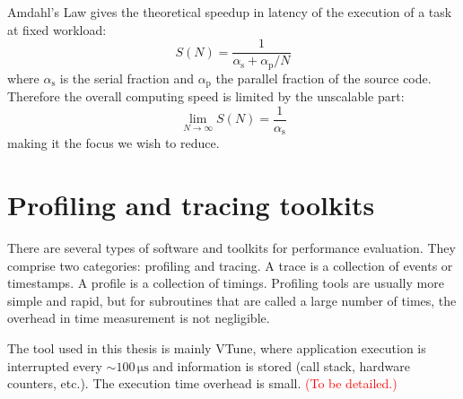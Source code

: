 Amdahl's Law gives the theoretical speedup in latency of the execution
of a task at fixed workload:
\begin{equation}
S(N)=\dfrac{1}{\alpha_{\mathrm{s}}+\alpha_{\mathrm{p}}/N}
\end{equation}
where $\alpha_{\mathrm{s}}$ is the serial fraction and $\alpha_{\mathrm{p}}$
the parallel fraction of the source code. Therefore the overall computing
speed is limited by the unscalable part:
\begin{equation}
\lim_{N\rightarrow\infty}S(N)=\frac{1}{\alpha_{\mathrm{s}}}
\end{equation}
making it the focus we wish to reduce.

\section{Profiling and tracing toolkits}

There are several types of software and toolkits for performance evaluation.
They comprise two categories: profiling and tracing. A trace is a
collection of events or timestamps. A profile is a collection of timings.
Profiling tools are usually more simple and rapid, but for subroutines
that are called a large number of times, the overhead in time measurement
is not negligible. 

The tool used in this thesis is mainly VTune, where application execution
is interrupted every $\sim100\,\mathrm{\mu s}$ and information is
stored (call stack, hardware counters, etc.). The execution time overhead
is small. \textcolor{red}{(To be detailed.)}

